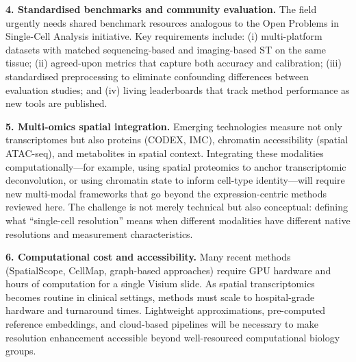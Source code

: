 \textbf{4. Standardised benchmarks and community evaluation.}
The field urgently needs shared benchmark resources analogous to the Open Problems in Single-Cell Analysis initiative. Key requirements include: (i) multi-platform datasets with matched sequencing-based and imaging-based ST on the same tissue; (ii) agreed-upon metrics that capture both accuracy and calibration; (iii) standardised preprocessing to eliminate confounding differences between evaluation studies; and (iv) living leaderboards that track method performance as new tools are published.

\textbf{5. Multi-omics spatial integration.}
Emerging technologies measure not only transcriptomes but also proteins (CODEX, IMC), chromatin accessibility (spatial ATAC-seq), and metabolites in spatial context. Integrating these modalities computationally---for example, using spatial proteomics to anchor transcriptomic deconvolution, or using chromatin state to inform cell-type identity---will require new multi-modal frameworks that go beyond the expression-centric methods reviewed here. The challenge is not merely technical but also conceptual: defining what ``single-cell resolution'' means when different modalities have different native resolutions and measurement characteristics.

\textbf{6. Computational cost and accessibility.}
Many recent methods (SpatialScope, CellMap, graph-based approaches) require GPU hardware and hours of computation for a single Visium slide. As spatial transcriptomics becomes routine in clinical settings, methods must scale to hospital-grade hardware and turnaround times. Lightweight approximations, pre-computed reference embeddings, and cloud-based pipelines will be necessary to make resolution enhancement accessible beyond well-resourced computational biology groups.
